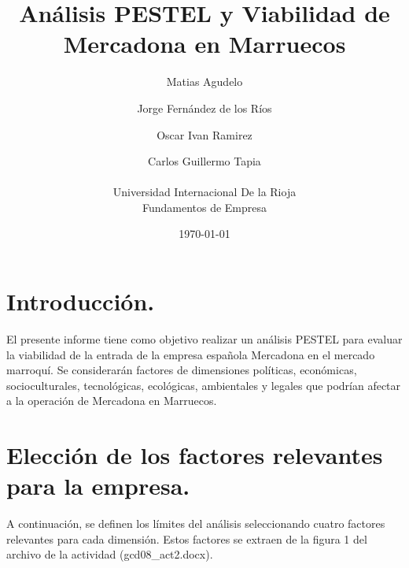 \documentclass{article}  %
\title{Análisis PESTEL y Viabilidad de Mercadona en Marruecos}  %
\author{
Matias Agudelo\and
Jorge Fernández de los Ríos\and
Oscar Ivan Ramirez\and
Carlos Guillermo Tapia
\\
\\
Universidad Internacional De la Rioja\\
 Fundamentos de Empresa
}  %
\date{\today}  %
\begin{document}

\maketitle  %

\section{Introducción.} %

El presente informe tiene como objetivo realizar un análisis PESTEL para evaluar la viabilidad de la entrada de la empresa española Mercadona en el mercado marroquí. Se considerarán factores de dimensiones políticas, económicas, socioculturales, tecnológicas, ecológicas, ambientales y legales que podrían afectar a la operación de Mercadona en Marruecos.

\section{Elección de los factores relevantes para la empresa.}

A continuación, se definen los límites del análisis seleccionando cuatro factores relevantes para cada dimensión. Estos factores se extraen de la figura 1 del archivo de la actividad (gcd08\_act2.docx).
\end{document}
